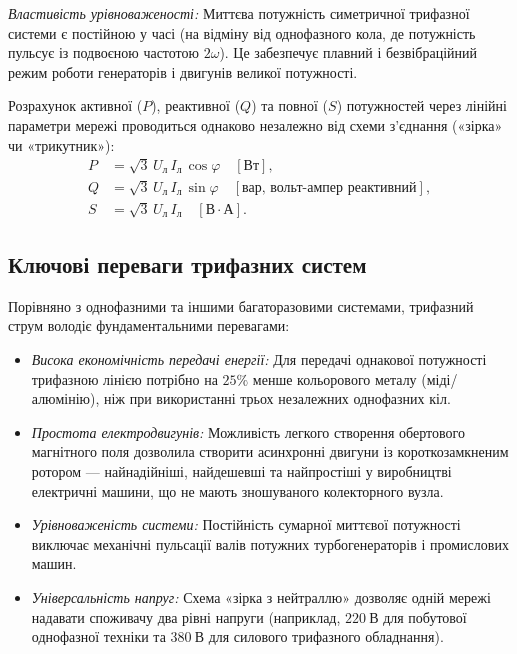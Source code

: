 \emph{Властивість урівноваженості:} Миттєва потужність симетричної трифазної системи є постійною у часі (на відміну від однофазного кола, де потужність пульсує із подвоєною частотою $2\omega$). Це забезпечує плавний і безвібраційний режим роботи генераторів і двигунів великої потужності.

Розрахунок активної ($P$), реактивної ($Q$) та повної ($S$) потужностей через лінійні параметри мережі проводиться однаково незалежно від схеми з'єднання («зірка» чи «трикутник»):
\begin{align}
	P &= \sqrt{3} \, U_\text{л} \, I_\text{л} \, \cos\varphi \quad [\text{Вт}], \\
	Q &= \sqrt{3} \, U_\text{л} \, I_\text{л} \, \sin\varphi \quad [\text{вар, вольт-ампер реактивний} ], \\
	S &= \sqrt{3} \, U_\text{л} \, I_\text{л} \quad [\text{В}\cdot\text{А}].
\end{align}

\subsection*{Ключові переваги трифазних систем}

Порівняно з однофазними та іншими багаторазовими системами, трифазний струм володіє фундаментальними перевагами:
\begin{itemize}
    \item \emph{Висока економічність передачі енергії:} Для передачі однакової потужності трифазною лінією потрібно на $25\%$ менше кольорового металу (міді/алюмінію), ніж при використанні трьох незалежних однофазних кіл.
    \item \emph{Простота електродвигунів:} Можливість легкого створення обертового магнітного поля дозволила створити асинхронні двигуни із короткозамкненим ротором --- найнадійніші, найдешевші та найпростіші у виробництві електричні машини, що не мають зношуваного колекторного вузла.
    \item \emph{Урівноваженість системи:} Постійність сумарної миттєвої потужності виключає механічні пульсації валів потужних турбогенераторів і промислових машин.
    \item \emph{Універсальність напруг:} Схема «зірка з нейтраллю» дозволяє одній мережі надавати споживачу два рівні напруги (наприклад, $220~\text{В}$ для побутової однофазної техніки та $380~\text{В}$ для силового трифазного обладнання).
\end{itemize}



